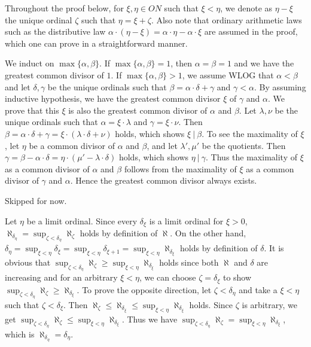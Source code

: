 \documentclass[12pt]{article}
\theoremstyle{definition}
\newenvironment{customthm}[1]
  {\renewcommand\theinnercustomthm{#1}\innercustomthm}
  {\endinnercustomthm}
\begin{document}
\begin{customthm}{I.9.56}
  Throughout the proof below, for $\xi,\eta\in ON$ such that $\xi<\eta$, we denote as $\eta-\xi$ the unique ordinal $\zeta$ such that $\eta=\xi+\zeta$. Also note that ordinary arithmetic laws such as the distributive law $\alpha\cdot(\eta-\xi)=\alpha\cdot\eta-\alpha\cdot\xi$ are assumed in the proof, which one can prove in a straightforward manner.

  We induct on $\max\{\alpha,\beta\}$. If $\max\{\alpha,\beta\}=1$, then $\alpha=\beta=1$ and we have the greatest common divisor of $1$. If $\max\{\alpha,\beta\}>1$, we assume WLOG that $\alpha<\beta$ and let $\delta,\gamma$ be the unique ordinals such that $\beta=\alpha\cdot\delta+\gamma$ and $\gamma<\alpha$. By assuming inductive hypothesis, we have the greatest common divisor $\xi$ of $\gamma$ and $\alpha$. We prove that this $\xi$ is also the greatest common divisor of $\alpha$ and $\beta$. Let $\lambda,\nu$ be the unique ordinals such that $\alpha=\xi\cdot\lambda$ and $\gamma=\xi\cdot\nu$. Then $\beta=\alpha\cdot\delta+\gamma=\xi\cdot(\lambda\cdot\delta+\nu)$ holds, which shows $\xi~|~\beta$. To see the maximality of $\xi$, let $\eta$ be a common divisor of $\alpha$ and $\beta$, and let $\lambda',\mu'$ be the quotients. Then $\gamma=\beta-\alpha\cdot\delta=\eta\cdot(\mu'-\lambda\cdot\delta)$ holds, which shows $\eta~|~\gamma$. Thus the maximality of $\xi$ as a common divisor of $\alpha$ and $\beta$ follows from the maximality of $\xi$ as a common divisor of $\gamma$ and $\alpha$. Hence the greatest common divisor always exists.
\end{customthm}

\begin{customthm}{I.11.7}
  Skipped for now.
\end{customthm}

\begin{customthm}{I.11.8}
  Let $\eta$ be a limit ordinal. Since every $\delta_\xi$ is a limit ordinal for $\xi>0$, $\aleph_{\delta_\eta}=\sup_{\zeta<\delta_\eta}\aleph_\zeta$ holds by definition of $\aleph$. On the other hand, $\delta_\eta=\sup_{\xi<\eta}\delta_\xi=\sup_{\xi<\eta}\delta_{\xi+1}=\sup_{\xi<\eta}\aleph_{\delta_\xi}$ holds by definition of $\delta$. It is obvious that $\sup_{\zeta<\delta_\eta}\aleph_\zeta\geq\sup_{\xi<\eta}\aleph_{\delta_\xi}$ holds since both $\aleph$ and $\delta$ are increasing and for an arbitrary $\xi<\eta$, we can choose $\zeta=\delta_\xi$ to show $\sup_{\zeta<\delta_\eta}\aleph_\zeta\geq\aleph_{\delta_\xi}$. To prove the opposite direction, let $\zeta<\delta_\eta$ and take a $\xi<\eta$ such that $\zeta<\delta_\xi$. Then $\aleph_\zeta\leq\aleph_{\delta_\xi}\leq\sup_{\xi<\eta}\aleph_{\delta_\xi}$ holds. Since $\zeta$ is arbitrary, we get $\sup_{\zeta<\delta_\eta}\aleph_\zeta\leq\sup_{\xi<\eta}\aleph_{\delta_\xi}$. Thus we have $\sup_{\zeta<\delta_\eta}\aleph_\zeta=\sup_{\xi<\eta}\aleph_{\delta_\xi}$, which is $\aleph_{\delta_\eta}=\delta_\eta$.
\end{customthm}
\end{document}
